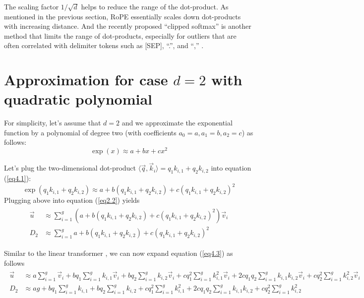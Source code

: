 \documentclass{article}
\numberwithin{equation}{section} %
\newcommand{\dpro}[1]{\langle #1 \rangle}  %
\def\q{\vec{q}}
\def\k{\vec{k}}
\def\v{\vec{v}}
\def\u{\vec{u}}
\def\dotqk{\dpro{\q, \k_i}}  %
\begin{document}
The scaling factor $1/\sqrt{d}$ helps to reduce the range of the dot-product. As mentioned in the previous section, RoPE essentially scales down dot-products with increasing distance. And the recently proposed “clipped softmax” \citep{quantizable} is another method that limits the range of dot-products, especially for outliers that are often correlated with delimiter tokens such as [SEP], “.”, and “,” \citep{quantizable}.

\section{Approximation for case $d = 2$ with quadratic polynomial}
For simplicity, let’s assume that $d = 2$ and we approximate the exponential function by a polynomial of degree two (with coefficients $a_0 = a, a_1 = b, a_2 = c$) as follows:
\begin{equation}
  \exp(x) \approx a + b x + c x^2
\label{eq4.1} \end{equation}

Let’s plug the two-dimensional dot-product $\dotqk = q_1 k_{i,1} + q_2 k_{i,2}$ into equation (\ref{eq4.1}):
\begin{equation}
  \exp(q_1 k_{i,1} + q_2 k_{i,2}) \approx a + b (q_1 k_{i,1} + q_2 k_{i,2}) + c (q_1 k_{i,1} + q_2 k_{i,2})^2
\end{equation}
Plugging above into equation (\ref{eq2.2}) yields
\begin{align} \begin{split}
  \u  &\approx \sum_{i=1}^g \left(a + b (q_1 k_{i,1} + q_2 k_{i,2}) + c (q_1 k_{i,1} + q_2 k_{i,2})^2 \right) \v_i \\
  D_2 &\approx \sum_{i=1}^g       a + b (q_1 k_{i,1} + q_2 k_{i,2}) + c (q_1 k_{i,1} + q_2 k_{i,2})^2
\label{eq4.3} \end{split} \end{align}

Similar to the linear transformer \citep{linear}, we can now expand equation (\ref{eq4.3}) as follows
\begin{align} \begin{split}
  \u  &\approx a \sum_{i=1}^g \v_i + b q_1 \sum_{i=1}^g k_{i,1} \v_i + b q_2 \sum_{i=1}^g k_{i,2} \v_i
        + c q_1^2 \sum_{i=1}^g k_{i,1}^2 \v_i + 2c q_1 q_2 \sum_{i=1}^g k_{i,1} k_{i,2} \v_i
        + c q_2^2 \sum_{i=1}^g k_{i,2}^2 \v_i \\
  D_2 &\approx a g + b q_1 \sum_{i=1}^g k_{i,1} + b q_2 \sum_{i=1}^g k_{i,2}
        + c q_1^2 \sum_{i=1}^g k_{i,1}^2 + 2c q_1 q_2 \sum_{i=1}^g k_{i,1} k_{i,2}
        + c q_2^2 \sum_{i=1}^g k_{i,2}^2
\label{eq4.4} \end{split} \end{align}
\end{document}
